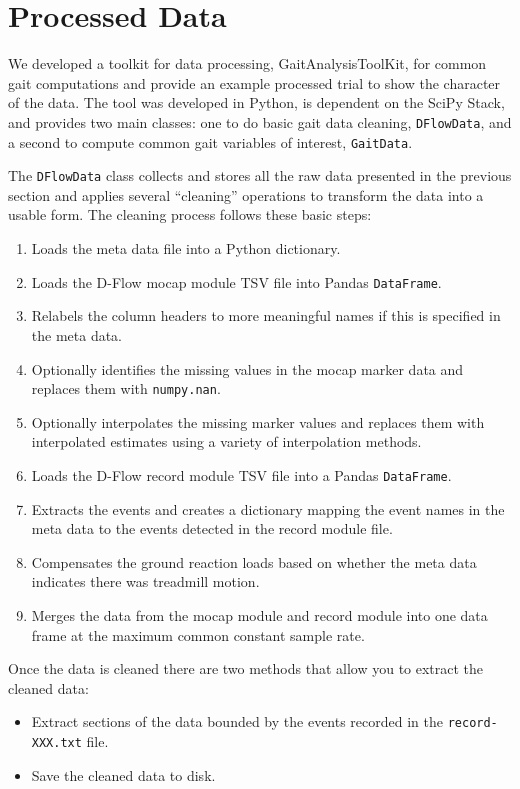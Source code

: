 \documentclass[10pt,a4paper,twocolumn]{article}
\begin{document}
\section*{Processed Data}

We developed a toolkit for data processing, GaitAnalysisToolKit, for common
gait computations and provide an example processed trial to show the character
of the data. The tool was developed in Python, is dependent on the SciPy Stack,
and provides two main classes: one to do basic gait data cleaning,
\verb|DFlowData|, and a second to compute common gait variables of interest,
\verb|GaitData|.

The \verb|DFlowData| class collects and stores all the raw data presented in
the previous section and applies several ``cleaning'' operations to transform
the data into a usable form. The cleaning process follows these basic steps:

\begin{enumerate}
  \item Loads the meta data file into a Python dictionary.
  \item Loads the D-Flow mocap module TSV file into Pandas \verb|DataFrame|.
  \item Relabels the column headers to more meaningful names if this is
    specified in the meta data.
  \item Optionally identifies the missing values in the mocap marker data and
    replaces them with \verb|numpy.nan|.
  \item Optionally interpolates the missing marker values and replaces them
    with interpolated estimates using a variety of interpolation methods.
  \item Loads the D-Flow record module TSV file into a Pandas \verb|DataFrame|.
  \item Extracts the events and creates a dictionary mapping the event names in
    the meta data to the events detected in the record module file.
  \item Compensates the ground reaction loads based on whether the meta data
    indicates there was treadmill motion.
  \item Merges the data from the mocap module and record module into one data
    frame at the maximum common constant sample rate.
\end{enumerate}

Once the data is cleaned there are two methods that allow you to extract the
cleaned data:

\begin{itemize}
  \item Extract sections of the data bounded by the events recorded in the
    \verb|record-XXX.txt| file.
  \item Save the cleaned data to disk.
\end{itemize}
\end{document}
